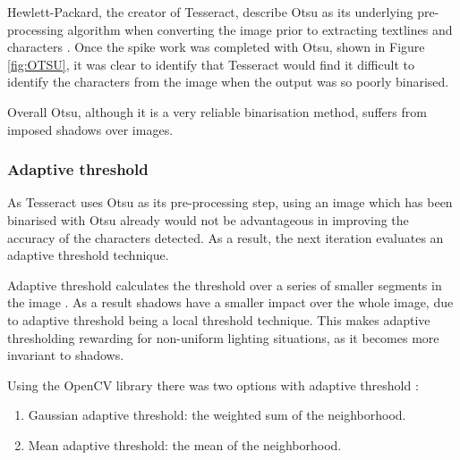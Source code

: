 Hewlett-Packard, the creator of Tesseract, describe Otsu as its underlying pre-processing algorithm when converting the image prior to extracting textlines and characters \cite{citeulike:13931186}. Once the spike work was completed with Otsu, shown in Figure \ref{fig:OTSU}, it was clear to identify that Tesseract would find it difficult to identify the characters from the image when the output was so poorly binarised.

Overall Otsu, although it is a very reliable binarisation method, suffers from imposed shadows over images.

\subsubsection{Adaptive threshold} \label{section:threshold}
As Tesseract uses Otsu as its pre-processing step, using an image which has been binarised with Otsu already would not be advantageous in improving the accuracy of the characters detected. As a result, the next iteration evaluates an adaptive threshold technique.

Adaptive threshold calculates the threshold over a series of smaller segments in the image \cite{citeulike:14021401}. As a result shadows have a smaller impact over the whole image, due to adaptive threshold being a local threshold technique. This makes adaptive thresholding rewarding for non-uniform lighting situations, as it becomes more invariant to shadows.

Using the OpenCV library there was two options with adaptive threshold \cite{citeulike:14021409}:
\begin{enumerate}
  \item Gaussian adaptive threshold: the weighted sum of the neighborhood.
  \item Mean adaptive threshold: the mean of the neighborhood.
\end{enumerate}

